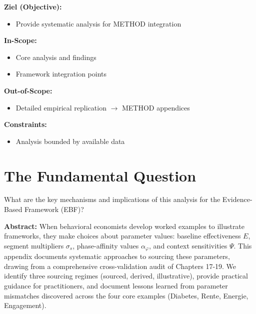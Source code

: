 \begin{tcolorbox}[
    colback=orange!5!white,
    colframe=orange!75!black,
    title={\textbf{Appendix Scope: Ziel / In-Scope / Out-of-Scope / Constraints}},
    fonttitle=\bfseries
]

\textbf{Ziel (Objective):}
\begin{itemize}[nosep]
    \item Provide systematic analysis for METHOD integration
\end{itemize}

\textbf{In-Scope:}
\begin{itemize}[nosep]
    \item Core analysis and findings
    \item Framework integration points
\end{itemize}

\textbf{Out-of-Scope:}
\begin{itemize}[nosep]
    \item Detailed empirical replication $\rightarrow$ METHOD appendices
\end{itemize}

\textbf{Constraints:}
\begin{itemize}[nosep]
    \item Analysis bounded by available data
\end{itemize}

\end{tcolorbox}

\section{The Fundamental Question}
\label{sec:jjj-fundamental}

\begin{tcolorbox}[colback=red!5!white, colframe=red!75!black,
    title=The Fundamental Question]
What are the key mechanisms and implications of this analysis for the
Evidence-Based Framework (EBF)?
\end{tcolorbox}


\textbf{Abstract:} When behavioral economists develop worked examples to illustrate frameworks, they make choices about parameter values: baseline effectiveness $E$, segment multipliers $\sigma_s$, phase-affinity values $\alpha_\varphi$, and context sensitivities $\Psi$. This appendix documents systematic approaches to sourcing these parameters, drawing from a comprehensive cross-validation audit of Chapters 17-19. We identify three sourcing regimes (sourced, derived, illustrative), provide practical guidance for practitioners, and document lessons learned from parameter mismatches discovered across the four core examples (Diabetes, Rente, Energie, Engagement).

